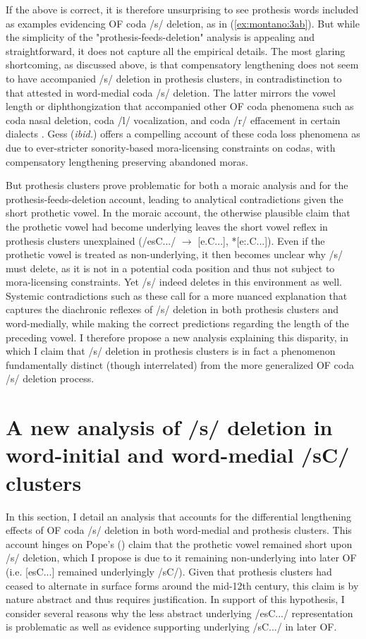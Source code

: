 \documentclass[output=paper,colorlinks,citecolor=brown,
]{langscibook}
\begin{document}
If the above is correct, it is therefore unsurprising to see prothesis words included as examples evidencing OF coda /s/ deletion, as in (\ref{ex:montano:3ab}).  But while the simplicity of the "prothesis-feeds-deletion" analysis is appealing and straightforward, it does not capture all the empirical details.  The most glaring shortcoming, as discussed above, is that compensatory lengthening does not seem to have accompanied /s/ deletion in prothesis clusters, in contradistinction to that attested in word-medial coda /s/ deletion.  The latter mirrors the vowel length or diphthongization that accompanied other OF coda phenomena such as coda nasal deletion, coda /l/ vocalization, and coda /r/ effacement in certain dialects \citep{Gess1998, Gess1999, baertschdavis2003}.  Gess (\textit{ibid.}) offers a compelling account of these coda loss phenomena as due to ever-stricter sonority-based mora-licensing constraints on codas, with compensatory lengthening preserving abandoned moras.
 
But prothesis clusters prove problematic for both a moraic analysis and for the prothesis-feeds-deletion account, leading to analytical contradictions given the short prothetic vowel.  In the moraic account, the otherwise plausible claim that the prothetic vowel had become underlying leaves the short vowel reflex in prothesis clusters unexplained (/esC.../ $\rightarrow$ [e.C...], *[e:.C...]).  Even if the prothetic vowel is treated as non-underlying, it then becomes unclear why /s/ must delete, as it is not in a potential coda position and thus not subject to mora-licensing constraints.  Yet /s/ indeed deletes in this environment as well.  Systemic contradictions such as these call for a more nuanced explanation that captures the diachronic reflexes of /s/ deletion in both prothesis clusters and word-medially, while making the correct predictions regarding the length of the preceding vowel.  I therefore propose a new analysis explaining this disparity, in which I claim that /s/ deletion in prothesis clusters is in fact a phenomenon fundamentally distinct (though interrelated) from the more generalized OF coda /s/ deletion process.

\section{A new analysis of /s/ deletion in word-initial and word-medial /sC/ clusters}
In this section, I detail an analysis that accounts for the differential lengthening effects of OF coda /s/ deletion in both word-medial and prothesis clusters.  This account hinges on Pope's (\citeyear{Pope1952}) claim that the prothetic vowel remained short upon /s/ deletion, which I propose is due to it remaining non-underlying into later OF (i.e. [esC...] remained underlyingly /sC/).  Given that prothesis clusters had ceased to alternate in surface forms around the mid-12th century, this claim is by nature abstract and thus requires justification.  In support of this hypothesis, I consider several reasons why the less abstract underlying /esC.../ representation is problematic as well as evidence supporting underlying /sC.../ in later OF.
\end{document}

